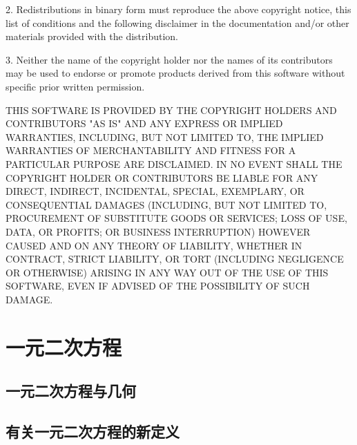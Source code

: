 \documentclass[lang=cn, 10pt, titlestyle=display, oneside, toc=twocol]{elegantbook}
\begin{document}
2. Redistributions in binary form must reproduce the above copyright notice,
   this list of conditions and the following disclaimer in the documentation
   and/or other materials provided with the distribution.

3. Neither the name of the copyright holder nor the names of its
   contributors may be used to endorse or promote products derived from
   this software without specific prior written permission.

THIS SOFTWARE IS PROVIDED BY THE COPYRIGHT HOLDERS AND CONTRIBUTORS "AS IS"
AND ANY EXPRESS OR IMPLIED WARRANTIES, INCLUDING, BUT NOT LIMITED TO, THE
IMPLIED WARRANTIES OF MERCHANTABILITY AND FITNESS FOR A PARTICULAR PURPOSE ARE
DISCLAIMED. IN NO EVENT SHALL THE COPYRIGHT HOLDER OR CONTRIBUTORS BE LIABLE
FOR ANY DIRECT, INDIRECT, INCIDENTAL, SPECIAL, EXEMPLARY, OR CONSEQUENTIAL
DAMAGES (INCLUDING, BUT NOT LIMITED TO, PROCUREMENT OF SUBSTITUTE GOODS OR
SERVICES; LOSS OF USE, DATA, OR PROFITS; OR BUSINESS INTERRUPTION) HOWEVER
CAUSED AND ON ANY THEORY OF LIABILITY, WHETHER IN CONTRACT, STRICT LIABILITY,
OR TORT (INCLUDING NEGLIGENCE OR OTHERWISE) ARISING IN ANY WAY OUT OF THE USE
OF THIS SOFTWARE, EVEN IF ADVISED OF THE POSSIBILITY OF SUCH DAMAGE.

\tableofcontents



\chapter{一元二次方程}











\section{一元二次方程与几何}

\section{有关一元二次方程的新定义}


\end{document}
